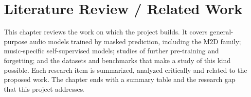 \documentclass{FastFyp}
\begin{document}
\chapter{Literature Review / Related Work}
\label{ch:lr}
\newcommand{\lritem}[3]{\begingroup\titleformat{\subsection}{\normalfont\large\bfseries\raggedright}{\thesubsection}{1em}{}\subsection{#1}\label{#3}\endgroup}
\newcommand{\lrsummary}{\subsubsection{Summary of the Research Item}}
\newcommand{\lrcritical}{\subsubsection{Critical Analysis of the Research Item}}
\newcommand{\lrrelation}{\subsubsection{Relationship to the Proposed Research Work}}
This chapter reviews the work on which the project builds. It covers general-purpose audio models trained by masked prediction, including the M2D family; music-specific self-supervised models; studies of further pre-training and forgetting; and the datasets and benchmarks that make a study of this kind possible. Each research item is summarized, analyzed critically and related to the proposed work. The chapter ends with a summary table and the research gap that this project addresses.
\end{document}
